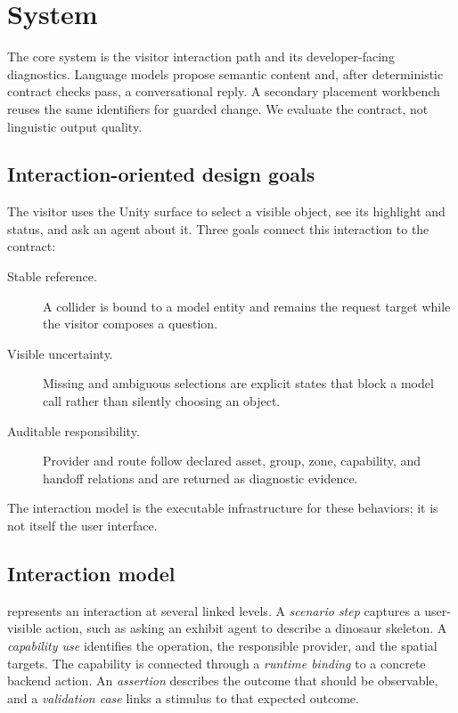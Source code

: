 \section{System}
\label{sec:system}

The core system is the visitor interaction path and its developer-facing
diagnostics. Language models propose semantic content and, after deterministic
contract checks pass, a conversational reply. A secondary placement workbench
reuses the same identifiers for guarded change. We evaluate the contract, not
linguistic output quality.

\subsection{Interaction-oriented design goals}

The visitor uses the Unity surface to select a visible object, see its highlight
and status, and ask an agent about it. Three goals connect this interaction to
the contract:

\begin{description}
  \item[Stable reference.] A collider is bound to a model entity and remains
  the request target while the visitor composes a question.
  \item[Visible uncertainty.] Missing and ambiguous selections are explicit
  states that block a model call rather than silently choosing an object.
  \item[Auditable responsibility.] Provider and route follow declared asset,
  group, zone, capability, and handoff relations and are returned as diagnostic
  evidence.
\end{description}

The interaction model is the executable infrastructure for these behaviors; it
is not itself the user interface.

\subsection{Interaction model}

\systemname{} represents an interaction at several linked levels. A
\emph{scenario step} captures a user-visible action, such as asking an exhibit
agent to describe a dinosaur skeleton. A \emph{capability use} identifies the
operation, the responsible provider, and the spatial targets. The capability is
connected through a \emph{runtime binding} to a concrete backend action. An
\emph{assertion} describes the outcome that should be observable, and a
\emph{validation case} links a stimulus to that expected outcome.

